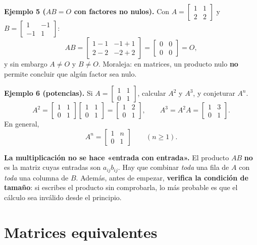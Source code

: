 \documentclass[12pt, letterpaper]{article}
\newcommand{\mwmat}[1]{\ensuremath{\begin{bmatrix}#1\end{bmatrix}}}
\begin{document}
\begin{cuadrosolucion}
  \small
  \textbf{Ejemplo 5 ($AB=O$ con factores no nulos).} Con
  $A=\mwmat{1&1\\2&2}$ y $B=\mwmat{1&-1\\-1&1}$:
  \[
    AB=\mwmat{1-1 & -1+1\\ 2-2 & -2+2}=\mwmat{0&0\\0&0}=O,
  \]
  y sin embargo $A\neq O$ y $B\neq O$. Moraleja: en matrices, un producto
  nulo \textbf{no} permite concluir que algún factor sea nulo.
\end{cuadrosolucion}

\begin{cuadrosolucion}
  \small
  \textbf{Ejemplo 6 (potencias).} Si $A=\mwmat{1&1\\0&1}$, calcular $A^2$ y
  $A^3$, y conjeturar $A^n$.
  \[
    A^2=\mwmat{1&1\\0&1}\mwmat{1&1\\0&1}=\mwmat{1&2\\0&1},
    \qquad
    A^3=A^2A=\mwmat{1&3\\0&1}.
  \]
  En general,
  \[
    A^n=\mwmat{1&n\\0&1}\qquad(n\ge1).
  \]
\end{cuadrosolucion}

\begin{cuadroadvertencia}
  \small
  \textbf{La multiplicación no se hace «entrada con entrada».} El producto
  $AB$ \textbf{no} es la matriz cuyas entradas son $a_{ij}b_{ij}$. Hay que
  combinar \emph{toda} una fila de $A$ con \emph{toda} una columna de $B$.
  Además, antes de empezar, \textbf{verifica la condición de tamaño}: si
  escribes el producto sin comprobarla, lo más probable es que el cálculo sea
  inválido desde el principio.
\end{cuadroadvertencia}

\section{Matrices equivalentes}
\end{document}
